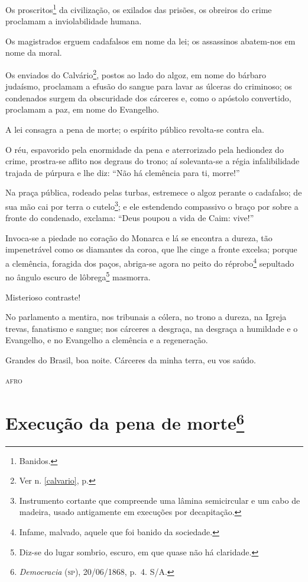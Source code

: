 Os proscritos\footnote{Banidos.} da civilização, os exilados das
prisões, os obreiros do crime proclamam a inviolabilidade humana.

Os magistrados erguem cadafalsos em nome da lei; os assassinos
abatem-nos em nome da moral.

Os enviados do Calvário\footnote{Ver n. \ref{calvario}, p. \pageref{calvario}}, 
postos ao lado do algoz, em nome do bárbaro judaísmo,
proclamam a efusão do sangue para lavar as úlceras do criminoso; os
condenados surgem da obscuridade dos cárceres e, como o apóstolo
convertido, proclamam a paz, em nome do Evangelho.

A lei consagra a pena de morte; o espírito público revolta-se contra
ela.

O réu, espavorido pela enormidade da pena e aterrorizado pela hediondez
do crime, prostra-se aflito nos degraus do trono; aí solevanta-se a
régia infalibilidade trajada de púrpura e lhe diz: ``Não há clemência
para ti, morre!''

Na praça pública, rodeado pelas turbas, estremece o algoz perante o
cadafalso; de sua mão cai por terra o cutelo\footnote{Instrumento
  cortante que compreende uma lâmina semicircular e um cabo de madeira,
  usado antigamente em execuções por decapitação.}; e ele estendendo
compassivo o braço por sobre a fronte do condenado, exclama: ``Deus
poupou a vida de Caim: vive!''

Invoca-se a piedade no coração do Monarca e lá se encontra a dureza, tão
impenetrável como os diamantes da coroa, que lhe cinge a fronte excelsa;
porque a clemência, foragida dos paços, abriga-se agora no peito do
réprobo\footnote{Infame, malvado, aquele que foi banido da sociedade.}
sepultado no ângulo escuro de lôbrega\footnote{Diz-se do lugar
  sombrio, escuro, em que quase não há claridade.} masmorra.

Misterioso contraste!

No parlamento a mentira, nos tribunais a cólera, no trono a dureza, na
Igreja trevas, fanatismo e sangue; nos cárceres a desgraça, na desgraça
a humildade e o Evangelho, e no Evangelho a clemência e a regeneração.

Grandes do Brasil, boa noite. Cárceres da minha terra, eu vos saúdo.

\begin{flushright}
\textsc{afro}
\end{flushright}


\chapter{Execução da pena de morte\footnote{\emph{Democracia} (\textsc{sp}),
  20/06/1868, p.~4. S/A.}}

